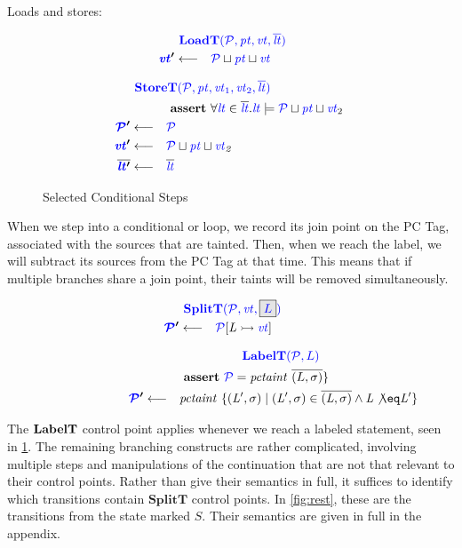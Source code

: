 \documentclass[acmsmall,review,anonymous]{acmart}\settopmatter{printfolios=true,printccs=false,printacmref=false}
\begin{document}
Loads and stores:

\begin{minipage}[t]{.4\textwidth}
\[\begin{aligned}
\truledef{\loadt}
\settag{\vt'}{\PCT \sqcup \pt \sqcup \vt}
\end{aligned}\]
\end{minipage}
\begin{minipage}[t]{.59\textwidth}
\[\begin{aligned}
\truledef{\storet}
\assert{\forall \lt \in \overline{\lt} . \lt \models \PCT \sqcup \pt \sqcup \vt_2}
\settag{\PCT'}{\PCT}
\settag{\vt'}{\PCT \sqcup \pt \sqcup \vt_2}
\settag{\overline{\lt'}}{\overline{\lt}}
\end{aligned}\]
\end{minipage}

\begin{figure}
  \ifstepb
  
  \whiletruestep
  \whilefalsestep
  \whileskipcontinuestep
  \whilebreakstep


  \caption{Selected Conditional Steps}
  \label{fig:conditionals}
\end{figure}


When we step into a conditional or loop, we record its join point on the PC Tag, associated with the sources
that are tainted. Then, when we reach the label, we will subtract its sources from the PC Tag at that time.
This means that if multiple branches share a join point, their taints will be removed simultaneously.

\begin{minipage}[t]{.25\textwidth}
\[\begin{aligned}
\truledef{\splitt}
\settag{\PCT'}{\PCT[L \rightarrowtail \vt]}
\end{aligned}\]
\end{minipage}
\begin{minipage}[t]{.74\textwidth}
\[\begin{aligned}
\truledef{\labelt}
\assert{\PCT = \mathit{pctaint} ~ \overline{(L,\sigma)}\}}
\settag{\PCT'}{\mathit{pctaint} ~ \{(L',\sigma) \mid (L',\sigma) \in \overline{(L,\sigma)} \land L \not \eq L'\}}
\end{aligned}\]
\end{minipage}

The \(\mathbf{LabelT}\) control point applies whenever we reach a labeled statement, seen
in \cref{fig:conditionals}.
The remaining branching constructs are rather complicated, involving multiple steps
and manipulations of the continuation that are not that relevant to their control
points. Rather than give their semantics in full, it suffices to identify which
transitions contain \(\mathbf{SplitT}\) control points. In \cref{fig:rest}, these
are the transitions from the state marked \(S\). Their semantics are given in full
in the appendix.
\end{document}
